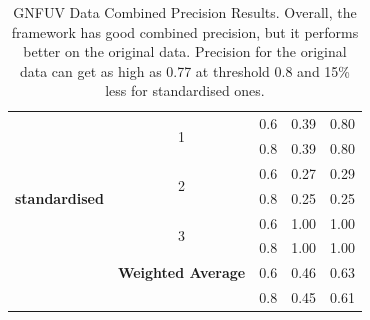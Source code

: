 \documentclass{mpaper}
\begin{document}
\begin{table}[]
\begin{tabular}{|c|cccc|}
                            & \multicolumn{1}{c|}{\multirow{2}{*}{1}}        & \multicolumn{1}{c|}{0.6}                & 0.39             & 0.80              \\
                            & \multicolumn{1}{c|}{}                          & \multicolumn{1}{c|}{0.8}                & 0.39             & 0.80              \\ \cline{2-5} 
                            & \multicolumn{1}{c|}{\multirow{2}{*}{2}}        & \multicolumn{1}{c|}{0.6}                & 0.27             & 0.29              \\
\textbf{standardised}       & \multicolumn{1}{c|}{}                          & \multicolumn{1}{c|}{0.8}                & 0.25             & 0.25              \\ \cline{2-5} 
                            & \multicolumn{1}{c|}{\multirow{2}{*}{3}}        & \multicolumn{1}{c|}{0.6}                & 1.00             & 1.00              \\
                            & \multicolumn{1}{c|}{}                          & \multicolumn{1}{c|}{0.8}                & 1.00             & 1.00              \\ \cline{2-5} 
                            & \multicolumn{1}{c|}{\textbf{Weighted Average}} & \multicolumn{1}{c|}{0.6}                & 0.46             & 0.63              \\
                            & \multicolumn{1}{c|}{}                          & \multicolumn{1}{c|}{0.8}                & 0.45             & 0.61              \\ \hline
\end{tabular}
\caption{\label{tab:gnfuv_combined_preicision_results} GNFUV Data Combined Precision Results. Overall, the framework has good combined precision, but it performs better on the original data. Precision for the original data can get as high as 0.77 at threshold 0.8 and 15\% less for standardised ones.}
\end{table}
\end{document}
